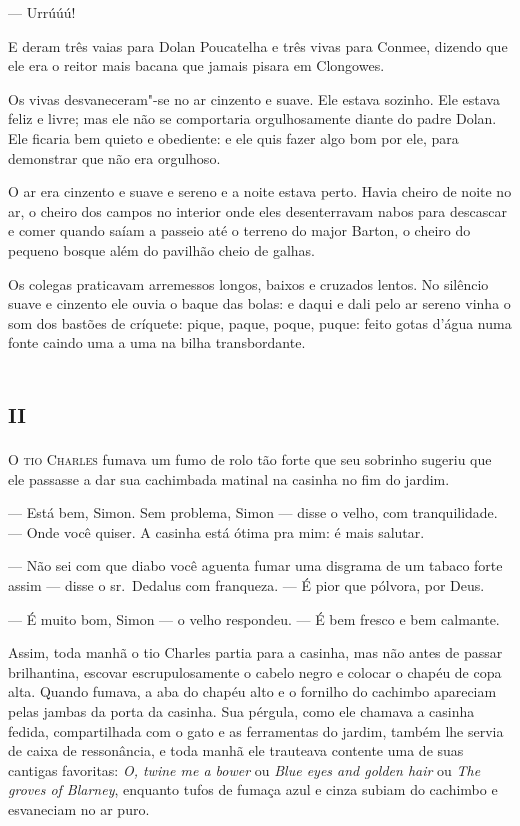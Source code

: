  --- Urrúúú!

E deram três vaias para Dolan Poucatelha e três vivas para Conmee,
dizendo que ele era o reitor mais bacana que jamais pisara em
Clongowes.

Os vivas desvaneceram"-se no ar cinzento e suave. Ele estava sozinho. Ele
estava feliz e livre; mas ele não se comportaria orgulhosamente diante
do padre Dolan. Ele ficaria bem quieto e obediente: e ele quis fazer
algo bom por ele, para demonstrar que não era orgulhoso.

O ar era cinzento e suave e sereno e a noite estava perto. Havia cheiro
de noite no ar, o cheiro dos campos no interior onde eles desenterravam
nabos para descascar e comer quando saíam a passeio até o terreno do
major Barton, o cheiro do pequeno bosque além do pavilhão cheio de
galhas.

Os colegas praticavam arremessos longos, baixos e cruzados lentos. No
silêncio suave e cinzento ele ouvia o baque das bolas: e daqui e dali
pelo ar sereno vinha o som dos bastões de críquete: pique, paque,
poque, puque: feito gotas d’água numa fonte caindo uma a uma na bilha
transbordante.


\chapter{\textsc{ii}}

\textsc{O tio Charles} fumava um fumo de rolo tão forte que seu sobrinho sugeriu
que ele passasse a dar sua cachimbada matinal na casinha no fim do
jardim.

 --- Está bem, Simon. Sem problema, Simon --- disse o velho, com
tranquilidade. --- Onde você quiser. A casinha está ótima pra mim: é mais
salutar.

--- Não sei com que diabo você aguenta fumar uma disgrama de um tabaco forte
assim --- disse o sr.~Dedalus com franqueza. --- É pior que pólvora, por Deus.

 --- É muito bom, Simon --- o velho respondeu. --- É bem fresco e bem calmante.

Assim, toda manhã o tio Charles partia para a casinha, mas não antes de
passar brilhantina, escovar escrupulosamente o cabelo negro e colocar o
chapéu de copa alta. Quando fumava, a aba do chapéu alto e o fornilho
do cachimbo apareciam pelas jambas da porta da casinha. Sua pérgula,
como ele chamava a casinha fedida, compartilhada com o gato e as
ferramentas do jardim, também lhe servia de caixa de ressonância, e
toda manhã ele trauteava contente uma de suas cantigas favoritas:
\textit{O, twine me a bower} ou \textit{Blue eyes and golden hair} ou
\textit{The groves of Blarney}, enquanto tufos de fumaça azul e cinza
subiam do cachimbo e esvaneciam no ar puro.

